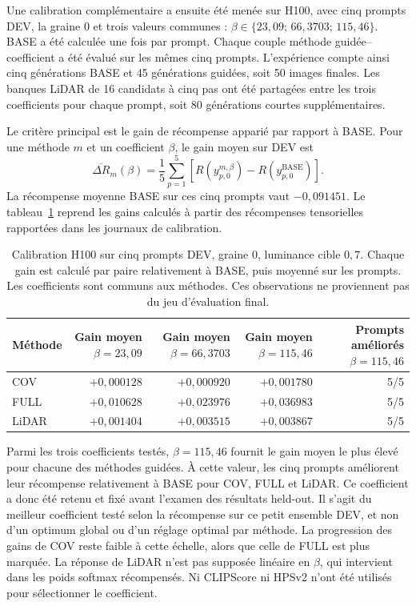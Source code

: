 \documentclass[11pt,a4paper]{article}
\begin{document}
Une calibration complémentaire a ensuite été menée sur H100, avec cinq prompts DEV, la graine 0 et trois valeurs communes : $\beta\in\{23{,}09;\,66{,}3703;\,115{,}46\}$. BASE a été calculée une fois par prompt. Chaque couple méthode guidée--coefficient a été évalué sur les mêmes cinq prompts. L'expérience compte ainsi cinq générations BASE et 45 générations guidées, soit 50 images finales. Les banques LiDAR de 16 candidats à cinq pas ont été partagées entre les trois coefficients pour chaque prompt, soit 80 générations courtes supplémentaires.

Le critère principal est le gain de récompense apparié par rapport à BASE. Pour une méthode $m$ et un coefficient $\beta$, le gain moyen sur DEV est
\[
\overline{\Delta R}_{m}(\beta)=\frac15\sum_{p=1}^{5}
\left[R(y_{p,0}^{m,\beta})-R(y_{p,0}^{\mathrm{BASE}})\right].
\]
La récompense moyenne BASE sur ces cinq prompts vaut $-0{,}091451$. Le tableau~\ref{tab:calibrationh100} reprend les gains calculés à partir des récompenses tensorielles rapportées dans les journaux de calibration.

\begin{table}[htbp]
\centering\small
\setlength{\tabcolsep}{5pt}
\begin{tabular}{lrrrr}
\toprule
Méthode & \shortstack{Gain moyen\\$\beta=23{,}09$} & \shortstack{Gain moyen\\$\beta=66{,}3703$} & \shortstack{Gain moyen\\$\beta=115{,}46$} & \shortstack{Prompts améliorés\\$\beta=115{,}46$}\\
\midrule
COV & $+0{,}000128$ & $+0{,}000920$ & $+0{,}001780$ & 5/5\\
FULL & $+0{,}010628$ & $+0{,}023976$ & $+0{,}036983$ & 5/5\\
LiDAR & $+0{,}001404$ & $+0{,}003515$ & $+0{,}003867$ & 5/5\\
\bottomrule
\end{tabular}
\caption{Calibration H100 sur cinq prompts DEV, graine 0, luminance cible $0{,}7$. Chaque gain est calculé par paire relativement à BASE, puis moyenné sur les prompts. Les coefficients sont communs aux méthodes. Ces observations ne proviennent pas du jeu d'évaluation final.}
\label{tab:calibrationh100}
\end{table}

Parmi les trois coefficients testés, $\beta=115{,}46$ fournit le gain moyen le plus élevé pour chacune des méthodes guidées. À cette valeur, les cinq prompts améliorent leur récompense relativement à BASE pour COV, FULL et LiDAR. Ce coefficient a donc été retenu et fixé avant l'examen des résultats held-out. Il s'agit du meilleur coefficient testé selon la récompense sur ce petit ensemble DEV, et non d'un optimum global ou d'un réglage optimal par méthode. La progression des gains de COV reste faible à cette échelle, alors que celle de FULL est plus marquée. La réponse de LiDAR n'est pas supposée linéaire en $\beta$, qui intervient dans les poids softmax récompensés. Ni CLIPScore ni HPSv2 n'ont été utilisés pour sélectionner le coefficient.
\end{document}
